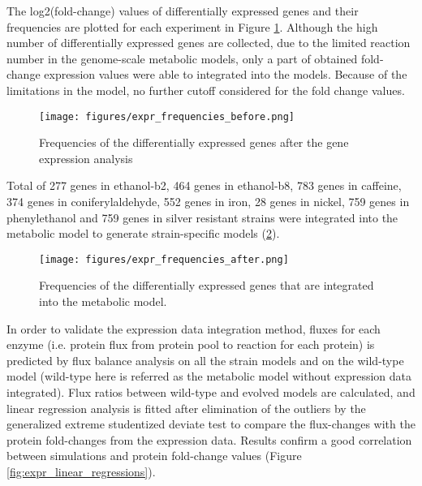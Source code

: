 The log2(fold-change) values of differentially expressed genes and their frequencies are plotted for each experiment in Figure \ref{fig:expr_frequencies_before}. Although the high number of differentially expressed genes are collected, due to the limited reaction number in the genome-scale metabolic models, only a part of obtained fold-change expression values were able to integrated into the models. Because of the limitations in the model, no further cutoff considered for the fold change values.

\begin{figure}[H]
\begin{center}
\texttt{[image: figures/expr\_frequencies\_before.png]}
\caption[Frequencies of the differentially expressed genes after the gene expression analysis]{Frequencies of the differentially expressed genes after the gene expression analysis}
\end{center}
\label{fig:expr_frequencies_before}
\end{figure}

Total of 277 genes in ethanol-b2, 464 genes in ethanol-b8, 783 genes in caffeine, 374 genes in coniferylaldehyde, 552 genes in iron, 28 genes in nickel, 759 genes in phenylethanol and 759 genes in silver resistant strains were integrated into the metabolic model to generate strain-specific models (\ref{fig:expr_frequencies_after}).

\begin{figure}[H]
\begin{center}
\texttt{[image: figures/expr\_frequencies\_after.png]}
\caption[Frequencies of the differentially expressed genes that are integrated into the metabolic model]{Frequencies of the differentially expressed genes that are integrated into the metabolic model.}
\end{center}
\label{fig:expr_frequencies_after}
\end{figure}

In order to validate the expression data integration method, fluxes for each enzyme (i.e. protein flux from protein pool to reaction for each protein) is predicted by flux balance analysis on all the strain models and on the wild-type model (wild-type here is referred as the metabolic model without expression data integrated). Flux ratios between wild-type and evolved models are calculated, and linear regression analysis is fitted after elimination of the outliers by the generalized extreme studentized deviate test to compare the flux-changes with the protein fold-changes from the expression data. Results confirm a good correlation between simulations and protein fold-change values (Figure \ref{fig:expr_linear_regressions}).

